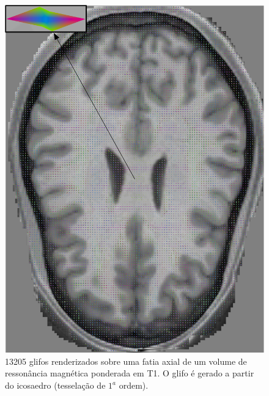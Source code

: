 \begin{figure}[H]
     \centering
     \includegraphics[width=1.0\linewidth, angle=0]{figs/Renderizacao_glifos_evolucao/Adaptividade-multimodal/Fatia_glifo_tf_12.png}
      \caption{13205 glifos renderizados sobre uma fatia axial de um volume de ressonância magnética ponderada em T1. O glifo é gerado a partir do icosaedro (tesselação de $1^a$ ordem).}
       \label{fig::qualidade_visual_longe_lowres_0}
 \end{figure}


 
